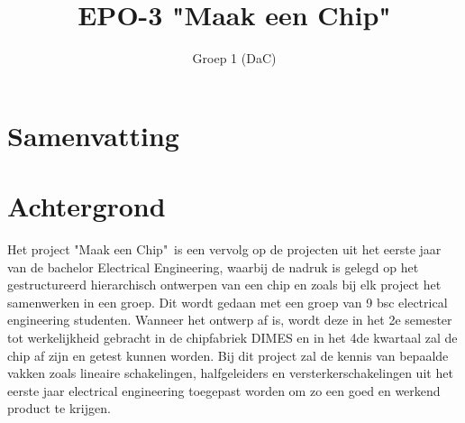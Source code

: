 \documentclass{scrartcl}
\title{EPO-3 "Maak een Chip"}
\author{Groep 1 (DaC)}
\date{}
\begin{document}
\maketitle
{}
\vspace{80 mm}
\section*{Samenvatting}
\newpage
\setlength{\cftbeforetoctitleskip}{-3em}

\tableofcontents
\clearpage

\section{Achtergrond}
Het project "Maak een Chip"\ is een vervolg op de projecten uit het eerste jaar van de bachelor Electrical Engineering, waarbij de nadruk is gelegd op het gestructureerd hierarchisch ontwerpen van een chip en zoals bij elk project het samenwerken in een groep. Dit wordt gedaan met een groep van 9 bsc electrical engineering studenten. Wanneer het ontwerp af is, wordt deze in het 2e semester tot werkelijkheid gebracht in de chipfabriek DIMES en in het 4de kwartaal zal de chip af zijn en getest kunnen worden. Bij dit project zal de kennis van bepaalde vakken zoals lineaire schakelingen, halfgeleiders en versterkerschakelingen uit het eerste jaar electrical engineering toegepast worden om zo een goed en werkend product te krijgen.
\end{document}
